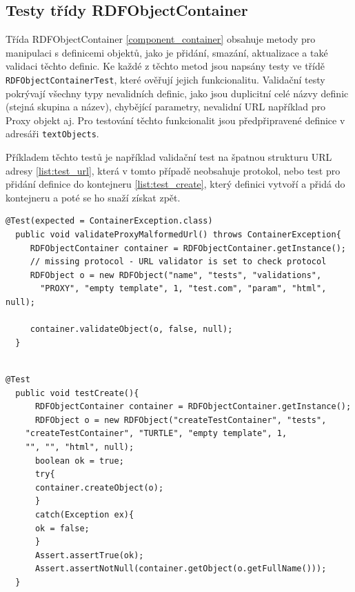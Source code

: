 \documentclass[thesis=B,czech]{FITthesis}[2012/06/26]
\begin{document}
  \subsection{Testy třídy RDFObjectContainer}
  Třída RDFObjectContainer \ref{component_container} obsahuje metody pro manipulaci s definicemi objektů, jako je přidání, smazání,
  aktualizace a také validaci těchto definic.
  Ke každé z těchto metod jsou napsány testy ve třídě\\
  \texttt{RDFObjectContainerTest}, které ověřují jejich funkcionalitu. Validační testy pokrývají všechny typy nevalidních definic, jako jsou duplicitní
  celé názvy definic (stejná skupina a název), chybějící parametry, nevalidní URL například pro Proxy objekt aj.  
  Pro testování těchto funkcionalit jsou předpřipravené definice v adresáři \texttt{textObjects}.
  
  Příkladem těchto testů je například validační test na špatnou strukturu URL adresy \ref{list:test_url}, která v tomto případě neobsahuje protokol, nebo test
  pro přidání definice do kontejneru \ref{list:test_create}, který definici vytvoří a přidá do kontejneru a poté se ho snaží získat zpět.
  
    \begin{lstlisting}[float=htb,caption={Unit test třídy RDFObjectContainer: Malformed URL},label=list:test_url]
  @Test(expected = ContainerException.class)
  public void validateProxyMalformedUrl() throws ContainerException{
     RDFObjectContainer container = RDFObjectContainer.getInstance();
     // missing protocol - URL validator is set to check protocol
     RDFObject o = new RDFObject("name", "tests", "validations",
       "PROXY", "empty template", 1, "test.com", "param", "html", null);

     container.validateObject(o, false, null);
  }
    
\end{lstlisting}

\begin{lstlisting}[float=htb,caption={Unit test třídy RDFObjectContainer: Vytvoření a vložení definice},label=list:test_create]
  @Test
  public void testCreate(){
      RDFObjectContainer container = RDFObjectContainer.getInstance();
      RDFObject o = new RDFObject("createTestContainer", "tests",
	"createTestContainer", "TURTLE", "empty template", 1,
	"", "", "html", null);
      boolean ok = true;
      try{
	  container.createObject(o);
      }
      catch(Exception ex){
	  ok = false;
      }
      Assert.assertTrue(ok);
      Assert.assertNotNull(container.getObject(o.getFullName()));
  }
    
\end{lstlisting}
  
\end{document}
